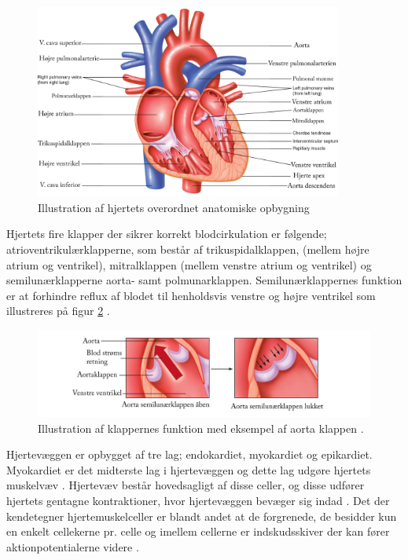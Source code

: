\begin{figure}[H] %
\begin{center}
\includegraphics[width=0.9\textwidth]{figures/hjertet_overordnet.png}
\end{center}
\caption{Illustration af hjertets overordnet anatomiske opbygning \cite{cindy}}
\label{fig:hjerte_overordnet}
\end{figure}

\noindent Hjertets fire klapper der sikrer korrekt blodcirkulation er følgende; atrioventrikulærklapperne, som består af trikuspidalklappen, (mellem højre atrium og ventrikel), mitralklappen (mellem venstre atrium og ventrikel) og semilunærklapperne aorta- samt polmunarklappen. Semilunærklappernes funktion er at forhindre reflux af blodet til henholdsvis venstre og højre ventrikel som illustreres på figur \ref{fig:hjerte_klap} \cite{gronanatomi}  .  


\begin{figure}[H] %
\begin{center}
\includegraphics[width=1\textwidth]{figures/cusp.png}
\end{center}
\caption{Illustration af klappernes funktion med eksempel af aorta klappen \cite{cindy}.}
\label{fig:hjerte_klap}
\end{figure}

\noindent Hjertevæggen er opbygget af tre lag; endokardiet, myokardiet og epikardiet. Myokardiet er det midterste lag i hjertevæggen og dette lag udgøre hjertets muskelvæv \cite{gronanatomi}. Hjertevæv består hovedsagligt af disse celler, og disse udfører hjertets gentagne kontraktioner, hvor hjertevæggen bevæger sig indad \cite{cindy}. 
Det der kendetegner hjertemuskelceller er blandt andet at de forgrenede, de besidder kun en enkelt cellekerne pr. celle og imellem cellerne er indskudsskiver der kan fører aktionpotentialerne videre \cite{martini}.



